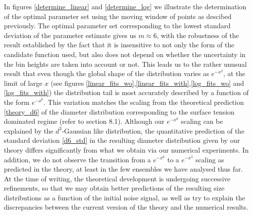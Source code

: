 In figures \ref{determine_linear} and \ref{determine_log} we illustrate the determination
of the optimal parameter set using the moving window of points as descibed previously.
The optimal parameter set corresponding to the lowest standard deviation of the parameter estimate
gives us $m \approx 6$, with the robustness of the result established by the fact that 
it is insensitive to not only the form of the candidate function used, but also does not depend 
on whether the uncertainty in the bin heights are taken into account or not.
This leads us to the rather unusual result that even though the global shape of 
the distribution varies as $e^{-x^2}$, at the limit of large $x$ 
(see figures \ref{linear_fits_wo},\ref{linear_fits_with},\ref{log_fits_wo} and \ref{log_fits_with})
the distribution tail is most accurately described by a function of the form $e^{-x^6}$.
This variation matches the scaling from the theoretical prediction \eqref{theory_d6} of the 
diameter distribution corresponding to the surface tension dominated regime (refer to section 8.1).
Although our $e^{-x^6}$ scaling can be explained by the $d^3$-Gaussian like distribution, 
the quantitative prediction of the standard deviation \eqref{d6_std} in the resulting diameter distribution
given by our theory differs significantly from what we obtain via our numerical experiments.
In addition, we do not observe the transition from a $e^{-x^6}$ to a $e^{-x^3}$ scaling 
as predicted in the theory, at least in the few ensembles we have analysed thus far. 
At the time of writing, the theoretical development is undergoing 
successive refinements, so that we may obtain better predictions of 
the resulting size distributions as a function of the initial 
noise signal, as well as try to explain the discrepancies between 
the current version of the theory and the numerical results.  


